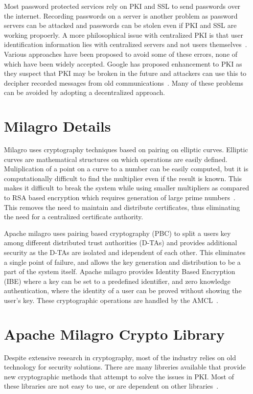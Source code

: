 Most password protected services rely on PKI and SSL to send passwords
over the internet. Recording passwords on a server is another problem
as password servers can be attacked and passwords can be stolen even
if PKI and SSL are working propoerly. A more philosophical issue with
centralized PKI is that user identification information lies with
centralized servers and not users
themselves~\cite{distlab-pki-problems}.  Various approaches have been
proposed to avoid some of these errors, none of which have been widely
accepted. Google has proposed enhancement to PKI as they suspect that
PKI may be broken in the future and attackers can use this to decipher
recorded messages from old
communications~\cite{securityweek-ssl-threats}.  Many of these
problems can be avoided by adopting a decentralized approach.


\section{Milagro Details}
Milagro uses cryptography techniques based on pairing on elliptic
curves. Elliptic curves are mathematical structures on which
operations are easily defined. Muliplication of a point on a curve to
a number can be easily computed, but it is computationally difficult
to find the multiplier even if the result is known. This makes it
difficult to break the system while using smaller multipliers as
compared to RSA based encryption which requires generation of large
prime numbers~\cite{milagro-concepts}. This removes the need to
maintain and distribute certificates, thus eliminating the need for a
centralized certificate authority.

Apache milagro uses pairing based cryptography (PBC) to split a users
key among different distributed trust authorities (D-TAs) and provides
additional security as the D-TAs are isolated and idependent of each
other. This eliminates a single point of failure, and allows the key
generation and distribution to be a part of the system itself. Apache
milagro provides Identity Based Encryption (IBE) where a key can be
set to a predefined identifier, and zero knowledge authentication,
where the identity of a user can be proved without showing the user's
key.  These cryptographic operations are handled by the
AMCL~\cite{milagro-concepts}.

\section{Apache Milagro Crypto Library}
Despite extensive research in cryptography, most of the industry
relies on old technology for security solutions. There are many
libreries available that provide new cryptographic methods that
attempt to solve the issues in PKI\@. Most of these libraries are not
easy to use, or are dependent on other
libraries~\cite{mcl-white-paper}.

